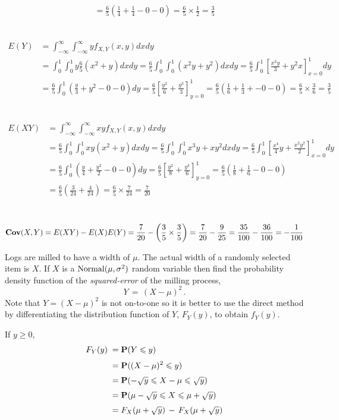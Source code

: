 \begin{ExerciseList}
\begin{align*}
= \frac{6}{5} \left(\frac{1}{4} + \frac{1}{4} - 0 - 0 \right) = \frac{6}{5}\times \frac{1}{2}=\frac{3}{5}
\end{align*}
\item~
\begin{align*}
E(Y) 
&= \int_{-\infty}^{\infty} \int_{-\infty}^{\infty} y f_{X,Y}(x,y) dx dy\\
&= \int_{0}^{1} \int_{0}^{1} y \frac{6}{5} \left( x^2 + y \right) dx dy
= \frac{6}{5} \int_{0}^{1} \int_{0}^{1}  \left( x^2y + y^2 \right) dx dy
= \frac{6}{5} \int_{0}^{1} \left[ \frac{x^3y}{3} + y^2x \right]_{x=0}^{1} dy\\
&= \frac{6}{5} \int_{0}^{1} \left( \frac{y}{3} + y^2 -0-0\right) dy
= \frac{6}{5} \left[ \frac{y^2}{6} + \frac{y^3}{3} \right]_{y=0}^{1} 
= \frac{6}{5} \left( \frac{1}{6} + \frac{1}{3} + - 0 -0 \right) = \frac{6}{5} \times \frac{3}{6}=\frac{3}{5}
\end{align*}
\item~
\begin{align*}
E(XY) 
&= \int_{-\infty}^{\infty} \int_{-\infty}^{\infty} xy f_{X,Y}(x,y) dx dy\\
&=\frac{6}{5} \int_{0}^{1} \int_{0}^{1}  xy \left( x^2 + y \right) dx dy
=\frac{6}{5} \int_{0}^{1} \int_{0}^{1} x^3y+xy^2 dx dy
=\frac{6}{5} \int_{0}^{1} \left[ \frac{x^4}{4}y+\frac{x^2 y^2}{2} \right]_{x=0}^1 dy\\
&=\frac{6}{5} \int_{0}^{1} \left( \frac{y}{4} + \frac{y^2}{2} -0-0\right)dy
=\frac{6}{5} \left[ \frac{y^2}{8} + \frac{y^3}{6}\right]_{y=0}^1 
=\frac{6}{5} \left(\frac{1}{8} + \frac{1}{6}-0-0\right)\\
&=\frac{6}{5} \left(\frac{3}{24}+\frac{4}{24}\right)=\frac{6}{5}\times\frac{7}{24}=\frac{7}{20}
\end{align*}
\item~
\[
\mathbf{Cov}(X,Y) = E(XY)-E(X)E(Y) = \frac{7}{20}-\left(\frac{3}{5} \times \frac{3}{5} \right) = \frac{7}{20}-\frac{9}{25} = \frac{35}{100}-\frac{36}{100} = -\frac{1}{100}
\]
\ee

\Exercise
Logs are milled to have a width of $\mu$.
The actual width of a randomly selected item is $X$.
If $X$ is a $\mbox{{\rm Normal}}(\mu,\sigma^2)$ random variable then find the probability density function of the {\em squared-error} of the milling process,
\[ Y\,=\, (X-\mu)^2\,.\]
\Answer
Note that $Y= (X-\mu)^2$ is not on-to-one so it is better to use the direct method by differentiating the distribution function  of $Y$, $F_Y(y)$,  to obtain $f_Y(y)$.

If $y\geqslant 0$,
\begin{align*}
 F_Y(y)\;=&\; \mathbf{P}(Y \leqslant y) \\[3pt]
 \;=&\;  \mathbf{P}( (X-\mu)^2 \leqslant y) \\[3pt]
 \;=&\; \mathbf{P}(-\sqrt y \leqslant X-\mu \leqslant \sqrt y)\\[3pt]
 \;=&\; \mathbf{P}(\mu -\sqrt y \leqslant X  \leqslant \mu + \sqrt y)\\[3pt]
\;=&\; F_X( \mu + \sqrt y) \,-\, F_X( \mu + \sqrt y)
\end{align*}


\end{ExerciseList}
